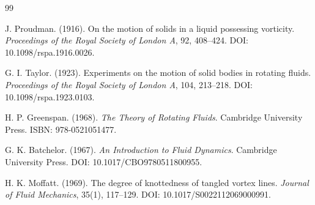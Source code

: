 \begin{thebibliography}{99}

J. Proudman. (1916).
\newblock On the motion of solids in a liquid possessing vorticity.
\newblock \emph{Proceedings of the Royal Society of London A}, 92, 408--424.
\newblock DOI: 10.1098/rspa.1916.0026.

G. I. Taylor. (1923).
\newblock Experiments on the motion of solid bodies in rotating fluids.
\newblock \emph{Proceedings of the Royal Society of London A}, 104, 213--218.
\newblock DOI: 10.1098/rspa.1923.0103.

H. P. Greenspan. (1968).
\newblock \emph{The Theory of Rotating Fluids}.
\newblock Cambridge University Press.
\newblock ISBN: 978-0521051477.

G. K. Batchelor. (1967).
\newblock \emph{An Introduction to Fluid Dynamics}.
\newblock Cambridge University Press.
\newblock DOI: 10.1017/CBO9780511800955.

H. K. Moffatt. (1969).
\newblock The degree of knottedness of tangled vortex lines.
\newblock \emph{Journal of Fluid Mechanics}, 35(1), 117--129.
\newblock DOI: 10.1017/S0022112069000991.

\end{thebibliography}